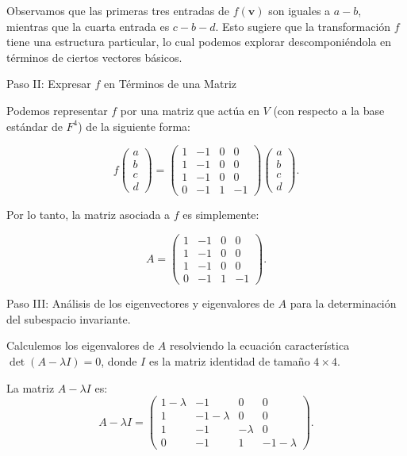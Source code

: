 \documentclass{article}
\begin{document}
Observamos que las primeras tres entradas de \( f(\mathbf{v}) \) son iguales a \( a - b \), mientras que la cuarta entrada es \( c - b - d \). Esto sugiere que la transformación \( f \) tiene una estructura particular, lo cual podemos explorar descomponiéndola en términos de ciertos vectores básicos.

Paso II: Expresar \( f \) en Términos de una Matriz

Podemos representar \( f \) por una matriz que actúa en \( V \) (con respecto a la base estándar de \( F^4 \)) de la siguiente forma:

\[
f \begin{pmatrix} a \\ b \\ c \\ d \end{pmatrix} = \begin{pmatrix} 1 & -1 & 0 & 0 \\ 1 & -1 & 0 & 0 \\ 1 & -1 & 0 & 0 \\ 0 & -1 & 1 & -1 \end{pmatrix} \begin{pmatrix} a \\ b \\ c \\ d \end{pmatrix}.
\]

Por lo tanto, la matriz asociada a \( f \) es simplemente:

\[
A = \begin{pmatrix} 1 & -1 & 0 & 0 \\ 1 & -1 & 0 & 0 \\ 1 & -1 & 0 & 0 \\ 0 & -1 & 1 & -1 \end{pmatrix}.
\]

Paso III: Análisis de los eigenvectores y eigenvalores de \( A \) para la determinación del subespacio invariante.

Calculemos los eigenvalores de \( A \) resolviendo la ecuación característica \( \det(A - \lambda I) = 0 \), donde \( I \) es la matriz identidad de tamaño \( 4 \times 4 \).

La matriz \( A - \lambda I \) es:
   \[
   A - \lambda I = \begin{pmatrix} 1 - \lambda & -1 & 0 & 0 \\ 1 & -1 - \lambda & 0 & 0 \\ 1 & -1 & -\lambda & 0 \\ 0 & -1 & 1 & -1 - \lambda \end{pmatrix}.
   \]
\end{document}
